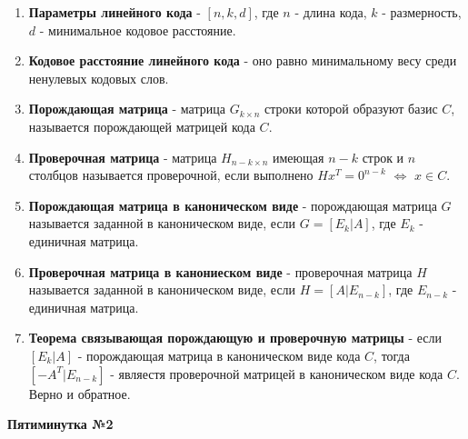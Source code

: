 \documentclass[a4paper, 12pt]{report}
\begin{document}
\begin{enumerate}
\item \textbf{Параметры линейного кода} - $[n, k, d] $, где $n $ - длина кода, $k $ - размерность, $d $ - минимальное кодовое расстояние.

\item \textbf{Кодовое расстояние линейного кода} - оно равно минимальному весу среди ненулевых кодовых слов.

\item \textbf{Порождающая матрица} - матрица $G_{k\times n} $ строки которой образуют базис $C $, называется порождающей матрицей кода $C $.

\item \textbf{Проверочная матрица} - матрица $H_{n-k\times n} $ имеющая $n-k $ строк и $n $ столбцов называется проверочной, если выполнено $H x^{T} = 0^{n-k}$  $\Leftrightarrow $  $x \in C $.

\item \textbf{Порождающая матрица в каноническом виде} - порождающая матрица $G $ называется заданной в каноническом виде, если $G = [E_{k}|A] $, где $E_{k} $ - единичная матрица.

\item \textbf{Проверочная матрица в канониеском виде} - проверочная матрица $H $ называется заданной в каноническом виде, если $H = [A|E_{n-k}] $, где $E_{n-k} $ - единичная матрица.

\item \textbf{Теорема связывающая порождающую и проверочную матрицы} - если $[E_{k}|A] $ - порождающая матрица в каноническом виде кода $C $, тогда $[-A^{T}|E_{n-k}] $ - являестя проверочной матрицей в каноническом виде кода $C $. Верно и обратное. 

\end{enumerate}


\textbf{Пятиминутка №2}
\end{document}
